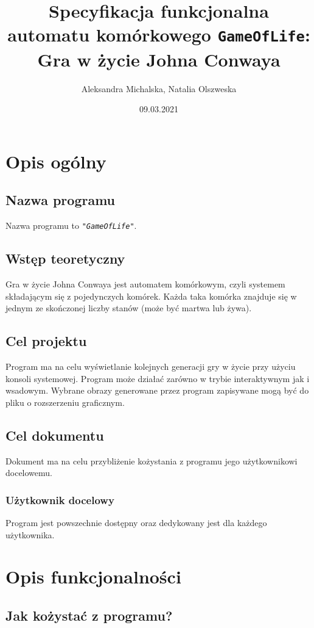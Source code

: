 \documentclass{article}
\title{Specyfikacja funkcjonalna automatu kom\'orkowego \texttt{GameOfLife}:
	Gra w \.zycie Johna Conwaya}
\author{Aleksandra Michalska, Natalia Olszweska}
\date{09.03.2021}
\begin{document}
\begin{titlepage}
	\maketitle
\end{titlepage}

\section{Opis og\'olny}
\subsection{Nazwa programu}
\quad Nazwa programu to \texttt{\textit{"GameOfLife"}}.
\subsection{Wst\k{e}p teoretyczny}
\quad Gra w \.zycie Johna Conwaya jest automatem kom\'orkowym, czyli systemem sk\l{}adaj\k{a}cym si\k{e} z pojedynczych kom\'orek. Ka\.zda taka kom\'orka znajduje si\k{e} w jednym ze sko\'nczonej liczby stan\'ow (mo\.ze by\'c martwa lub \.zywa). 
\subsection{Cel projektu}
\quad Program ma na celu wy\'swietlanie kolejnych generacji gry w \.zycie przy u\.zyciu konsoli systemowej. Program mo\.ze dzia\l{}a\'c zar\'owno w trybie interaktywnym jak i wsadowym. Wybrane obrazy generowane przez program zapisywane mog\k{a} by\'c do pliku o rozszerzeniu graficznym.
\subsection{Cel dokumentu}
\quad Dokument ma na celu przybli\.zenie ko\.zystania z programu jego u\.zytkownikowi docelowemu.
\subsubsection{U\.zytkownik docelowy}
\quad Program jest powszechnie dost\k{e}pny oraz dedykowany jest dla ka\.zdego u\.zytkownika.


\section{Opis funkcjonalno\'sci}
\subsection{Jak ko\.zysta\'c z programu?}
\end{document}

